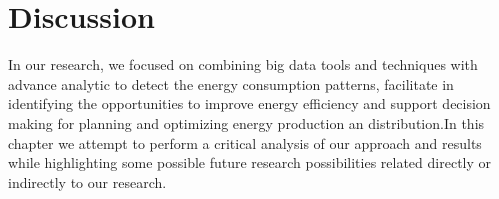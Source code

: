 \chapter{Discussion}
\label{chapter:discussion}
In our research, we focused on combining big data tools and techniques with advance analytic to detect the energy consumption patterns, facilitate in identifying the opportunities to improve energy efficiency and support decision making for planning and optimizing energy production an distribution.In this chapter we attempt to perform a critical analysis of our approach and results while highlighting some possible future research possibilities related directly or indirectly to our research.  